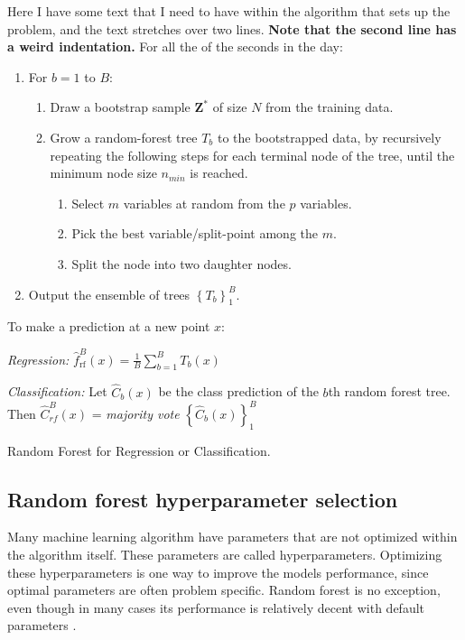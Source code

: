 \begin{algorithm}
    \footnotesize
    \begin{minipage}{.92\linewidth}
    Here I have some text that I need to have within the algorithm that
    sets up the problem, and the text stretches over two  lines.
    \textbf{Note that the second line has a weird indentation.}
    \BlankLine
    For all the of the seconds in the day:
    \begin{enumerate}
        \item For $b = 1$ to $B$:
        \begin{enumerate}
            \item Draw a bootstrap sample $\bm{Z}^{*}$ of size $N$ from the training data.
            \item Grow a random-forest tree $T_b$ to the bootstrapped data, by recursively repeating the following steps for each terminal node of the tree, until the minimum node size $n_{min}$ is reached.
            \begin{enumerate}
                \item Select $m$ variables at random from the $p$ variables.
                \item Pick the best variable/split-point among the $m$.
                \item Split the node into two daughter nodes.
            \end{enumerate}
        \end{enumerate}
        \item Output the ensemble of trees $\left\{ T _ { b } \right\} _ { 1 } ^ { B }$.
    \end{enumerate}
    To make a prediction at a new point $x$:

    \textit{Regression:} $\hat { f } _ { \mathrm { rf } } ^ { B } ( x ) = \frac { 1 } { B } \sum _ { b = 1 } ^ { B } T _ { b } ( x )$

    \textit{Classification:} Let $\hat { C } _ { b } ( x )$ be the class prediction of the $b$th random forest
    tree. Then $\hat{C} _ { r f } ^ { B } ( x )$ = \textit{majority vote} $\left\{ \hat { C } _ { b } ( x ) \right\} _ { 1 } ^ { B }$
    \end{minipage}
    \caption{\footnotesize Random Forest for Regression or Classification.}
    \label{alg:random_forest}
\end{algorithm}

\subsection{Random forest hyperparameter selection}
Many machine learning algorithm have parameters that are not optimized within the algorithm itself. These parameters are called hyperparameters. Optimizing these hyperparameters is one way to improve the models performance, since optimal parameters are often problem specific. Random forest is no exception, even though in many cases its performance is relatively decent with default parameters \cite{probst2018hyperparameters}.

